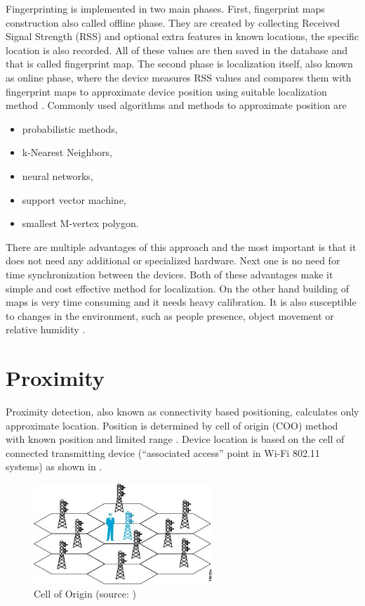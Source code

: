 Fingerprinting is implemented in two main phases. First, fingerprint maps construction also called offline phase. They are created by collecting Received Signal Strength (RSS) and optional extra features in known locations, the specific location is also recorded. All of these values are then saved in the database and that is called fingerprint map. The second phase is localization itself, also known as online phase, where the device measures RSS values and compares them with fingerprint maps to approximate device position using suitable localization method \cite{LocalizationApproaches, ILWTP}. Commonly used algorithms and methods to approximate position are \cite{IILUBLEB}

\begin{itemize}
	\item probabilistic methods,
	\item k-Nearest Neighbors,
	\item neural networks,
	\item support vector machine,
	\item smallest M-vertex polygon.
\end{itemize}

There are multiple advantages of this approach and the most important is that it does not need any additional or specialized hardware. Next one is no need for time synchronization between the devices. Both of these advantages make it simple and cost effective method for localization. On the other hand building of maps is very time consuming and it needs heavy calibration. It is also susceptible to changes in the environment, such as people presence, object movement or relative humidity \cite{IILUBLEB, RSSFofIFD}.

\section{Proximity}\label{sec:Proximity}
Proximity detection, also known as connectivity based positioning, calculates only approximate location. Position is determined by cell of origin (COO) method with known position and limited range \cite{RAinWILTaS}. Device location is based on the cell of connected transmitting device (\enquote{associated access} point in Wi-Fi 802.11 systems) as shown in  \cite{WiFiLBS}.

\begin{figure}[h!]
	\begin{centering}
		\includegraphics[width=0.6\textwidth]{img/cell_of_origin}
		\par\end{centering}
	\caption{Cell of Origin (source: \cite{WiFiLBS})\label{fig:CellOfOrigin}}
	\label{fig04c02}
\end{figure}

